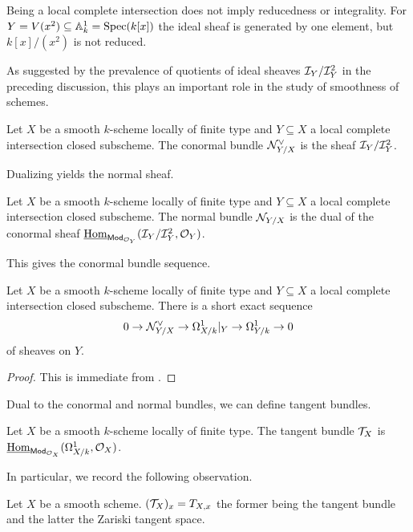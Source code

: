 \begin{example}
    Being a local complete intersection does not imply reducedness or integrality. For $Y=V(x^{2})\subseteq\mathbb{A}^{1}_{k}=\operatorname{Spec}(k[x])$ the ideal sheaf is generated by one element, but $k[x]/(x^{2})$ is not reduced. 
\end{example}
As suggested by the prevalence of quotients of ideal sheaves $\mathcal{I}_{Y}/\mathcal{I}_{Y}^{2}$ in the preceding discussion, this plays an important role in the study of smoothness of schemes. 
\begin{definition}\label{def: conormal sheaf}
    Let $X$ be a smooth $k$-scheme locally of finite type and $Y\subseteq X$ a local complete intersection closed subscheme. The conormal bundle $\mathcal{N}_{Y/X}^{\vee}$ is the sheaf $\mathcal{I}_{Y}/\mathcal{I}_{Y}^{2}$. 
\end{definition}
Dualizing yields the normal sheaf. 
\begin{definition}\label{def: normal sheaf}
    Let $X$ be a smooth $k$-scheme locally of finite type and $Y\subseteq X$ a local complete intersection closed subscheme. The normal bundle $\mathcal{N}_{Y/X}$ is the dual of the conormal sheaf $\underline{\mathrm{Hom}}_{\mathsf{Mod}_{\mathcal{O}_{Y}}}(\mathcal{I}_{Y}/\mathcal{I}_{Y}^{2},\mathcal{O}_{Y})$. 
\end{definition}
This gives the conormal bundle sequence. 
\begin{proposition}\label{prop: conormal bundle sequence}
    Let $X$ be a smooth $k$-scheme locally of finite type and $Y\subseteq X$ a local complete intersection closed subscheme. There is a short exact sequence 
    $$0\to\mathcal{N}_{Y/X}^{\vee}\to\Omega^{1}_{X/k}|_{Y}\to\Omega_{Y/k}^{1}\to 0$$
    of sheaves on $Y$. 
\end{proposition}
\begin{proof}
    This is immediate from . 
\end{proof}
Dual to the conormal and normal bundles, we can define tangent bundles. 
\begin{definition}\label{def: tangent bundle}
    Let $X$ be a smooth $k$-scheme locally of finite type. The tangent bundle $\mathcal{T}_{X}$ is $\underline{\mathrm{Hom}}_{\mathsf{Mod}_{\mathcal{O}_{X}}}(\Omega^{1}_{X/k},\mathcal{O}_{X})$. 
\end{definition}
In particular, we record the following observation. 
\begin{example}
    Let $X$ be a smooth scheme. $(\mathcal{T}_{X})_{x}=T_{X,x}$ the former being the tangent bundle and the latter the Zariski tangent space. 
\end{example}
